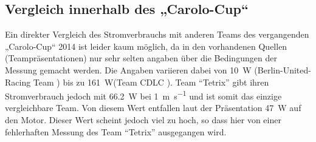\subsection{Vergleich innerhalb des „Carolo-Cup“}
Ein direkter Vergleich des Stromverbrauchs mit anderen Teams des vergangenden „Carolo-Cup“ 2014 ist leider kaum möglich, da in den vorhandenen Quellen (Teampräsentationen) nur sehr selten
angaben über die Bedingungen der Messung gemacht werden. Die Angaben variieren dabei von \SI{10}{\W} (Berlin-United-Racing Team \cite{cc-bu}) bis zu \SI{161}{\W}(Team CDLC \cite{cc-cdlc}).
Team ``Tetrix''\cite{cc-tx} gibt ihren Stromverbrauch jedoch mit \SI{66,2}{\W} bei \SI{1}{\metre\per\second} und ist somit das einzige vergleichbare Team. Von diesem Wert entfallen
laut der Präsentation \SI{47}{\W} auf den Motor. Dieser Wert scheint jedoch viel zu hoch, so dass hier von einer fehlerhaften Messung des Team ``Tetrix'' ausgegangen wird.

